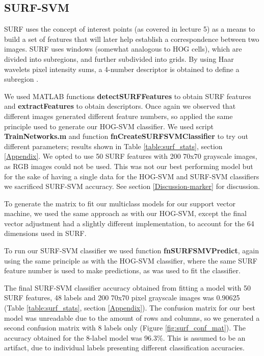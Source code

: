 \subsection{SURF-SVM}  
SURF uses the concept of interest points (as covered in lecture 5) as a means to build a set of features that will later help establish a correspondence between two images. SURF uses windows (somewhat analogous to HOG cells), which are divided into subregions, and further subdivided into grids. By using Haar wavelets pixel intensity sums, a 4-number descriptor is obtained to define a subregion \cite{Bay2008346}.  

We used MATLAB functions \textbf{detectSURFFeatures}  to obtain SURF features and \textbf{extractFeatures} to obtain descriptors. Once again we observed that different images generated different feature numbers, so applied the same principle used to generate our HOG-SVM classifier. We used script \textbf{TrainNetworks.m} and function \textbf{fnCreateSURFSVMClassifier} to try out different parameters; results shown in Table \ref{table:surf_stats}, section \ref{Appendix}. We opted to use 50 SURF features with 200 70x70 grayscale images, as RGB images could not be used. This was not our best performing model but for the sake of having a single data for the HOG-SVM and SURF-SVM classifiers we sacrificed SURF-SVM accuracy. See section \ref{Discussion-marker} for discussion.   

To generate the matrix to fit our multiclass models for our support vector machine, we used the same approach as with our HOG-SVM, except the final vector adjustment had a slightly different implementation, to account for the 64 dimensions used in SURF.

To run our SURF-SVM classifier we used function \textbf{fnSURFSMVPredict}, again using the same principle as with the HOG-SVM classifier, where the same SURF feature number is used to make predictions, as was used to fit the classifier.  

The final SURF-SVM classifier accuracy obtained from fitting a model with 50 SURF features, 48 labels and 200 70x70 pixel grayscale images was 0.90625 (Table \ref{table:surf_stats}, section \ref{Appendix}). The confusion matrix for our best model was unreadable due to the amount of rows and columns, so we generated a second confusion matrix with 8 labels only (Figure \ref{fig:surf_conf_mat}). The accuracy obtained for the 8-label model was 96.3\%. This is assumed to be an artifact, due to individual labels presenting different classification accuracies.

